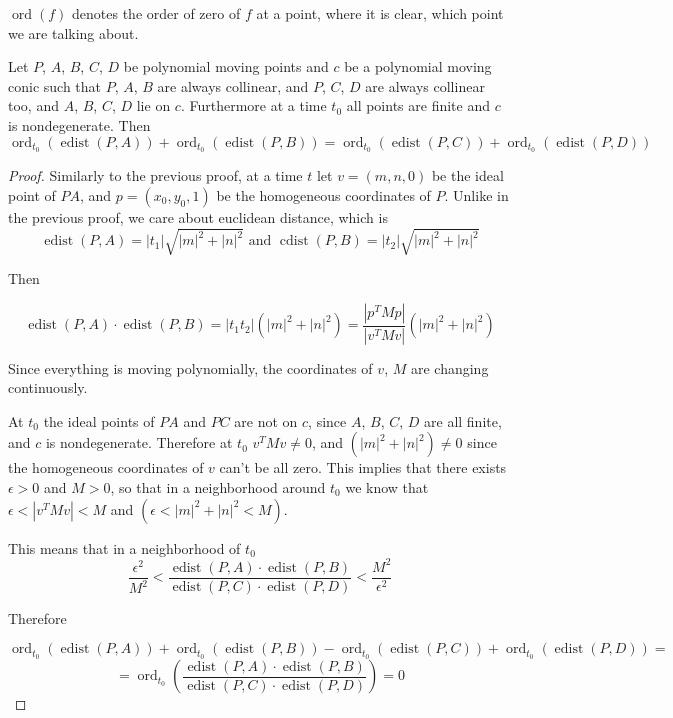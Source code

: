 \documentclass[a4paper]{article}
\newcommand{\ord}{\operatorname{ord}}
\newcommand{\edist}{\operatorname{edist}}
\begin{document}
$\ord(f)$ denotes the order of zero of $f$ at a point, where it is clear, which point we are talking about.

\begin{theorem}
    Let $P$, $A$, $B$, $C$, $D$ be polynomial moving points and $c$ be a polynomial moving conic such that $P$, $A$, $B$ are always collinear, and $P$, $C$, $D$ are always collinear too, and $A$, $B$, $C$, $D$ lie on $c$. Furthermore at a time $t_0$ all points are finite and $c$ is nondegenerate. Then
    $$\ord_{t_0}(\edist(P,A))+\ord_{t_0}(\edist(P,B))=\ord_{t_0}(\edist(P,C))+\ord_{t_0}(\edist(P,D))$$
\end{theorem}
\begin{proof}

    Similarly to the previous proof, at a time $t$ let $v=(m,n,0)$ be the ideal point of $PA$, and $p=(x_0,y_0,1)$ be the homogeneous coordinates of $P$.
    Unlike in the previous proof, we care about euclidean distance, which is
    $$\operatorname{edist}(P,A)=|t_1|\sqrt{|m|^2+|n|^2} \text{ and }\operatorname{cdist}(P,B)=|t_2|\sqrt{|m|^2+|n|^2}$$

    Then

    $$\operatorname{edist}(P,A)\cdot \operatorname{edist}(P,B)=|t_1t_2|(|m|^2+|n|^2)=\frac{|p^TMp|}{|v^TMv|}(|m|^2+|n|^2)$$

    Since everything is moving polynomially, the coordinates of $v$, $M$ are changing continuously.

    At $t_0$ the ideal points of $PA$ and $PC$ are not on $c$, since $A$, $B$, $C$, $D$ are all finite, and $c$ is nondegenerate. Therefore at $t_0$ $v^TMv\ne 0$, and $(|m|^2+|n|^2)\ne 0$ since the homogeneous coordinates of $v$ can't be all zero. This implies that there exists $\epsilon>0$ and $M>0$, so that in a neighborhood around $t_0$ we know that $\epsilon<|v^TMv|<M$ and $(\epsilon<|m|^2+|n|^2<M)$.

    This means that in a neighborhood of $t_0$
    $$\frac{\epsilon^2}{M^2}<\frac{\operatorname{edist}(P,A)\cdot \operatorname{edist}(P,B)}{\operatorname{edist}(P,C)\cdot \operatorname{edist}(P,D)}<\frac{M^2}{\epsilon^2}$$

    Therefore

    $$\ord_{t_0}(\edist(P,A))+\ord_{t_0}(\edist(P,B))-\ord_{t_0}(\edist(P,C))+\ord_{t_0}(\edist(P,D))=$$
    $$=\ord_{t_0}\left(\frac{\operatorname{edist}(P,A)\cdot \operatorname{edist}(P,B)}{\operatorname{edist}(P,C)\cdot \operatorname{edist}(P,D)}\right)=0$$
\end{proof}
\end{document}
